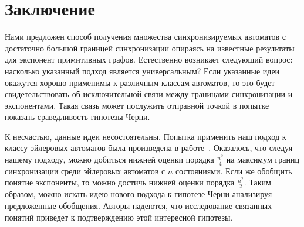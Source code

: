 \documentclass[11pt]{article}
\begin{document}
\section{Заключение}
Нами предложен способ получения множества синхронизируемых автоматов с достаточно большой
границей синхронизации опираясь на известные результаты для экспонент примитивных графов.
Естественно возникает следующий вопрос: насколько указанный подход является универсальным?
Если указанные идеи окажутся хорошо применимы к различным классам автоматов, то это будет
свидетельствовать об исключительной связи между границами синхронизации и экспонентами.
Такая связь может послужить отправной точкой в попытке показать сраведливость гипотезы
Черни.

К несчастью, данные идеи несостоятельны. Попытка применить наш подход к классу эйлеровых 
автоматов была произведена в работе~\cite{Gu11}. Оказалось, что следуя нашему подходу,
можно добиться нижней оценки порядка $\frac{n^2}{4}$ на максимум границ синхронизации
среди эйлеровых автоматов с $n$ состояниями. Если же обобщить понятие экспоненты, то
можно достичь нижней оценки порядка $\frac{n^2}{2}$. Таким образом, можно искать
идею нового подхода к гипотезе Черни анализируя предложенные обобщения. Авторы надеются,
что исследование связанных понятий приведет к подтверждению этой интересной гипотезы.
\end{document}
